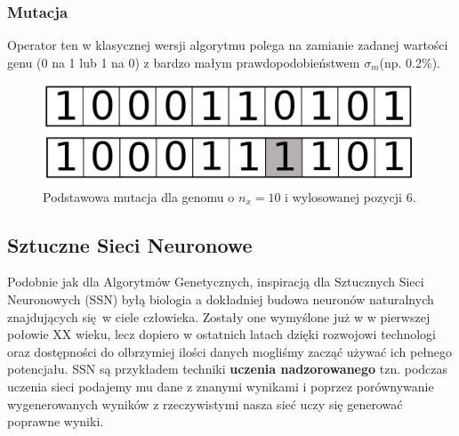 \documentclass{article}
\begin{document}
\subsubsection{Mutacja}
Operator ten w klasycznej wersji algorytmu polega na zamianie zadanej wartości genu
(0 na 1 lub 1 na 0) z bardzo małym  prawdopodobieństwem $\sigma_m$(np. 0.2\%).
\begin{figure}[H]
\centering
\includegraphics[scale=0.2]{mutation_v2.png}
\caption{Podstawowa mutacja dla genomu o $n_x = 10$ i wylosowanej pozycji 6.}
\end{figure}



\subsection{Sztuczne Sieci Neuronowe}
Podobnie jak dla Algorytmów Genetycznych, inspiracją dla Sztucznych Sieci Neuronowych (SSN) 
byłą biologia a dokładniej budowa neuronów naturalnych znajdujących się w ciele człowieka.
Zostały one wymyślone już w w pierwszej połowie XX wieku, lecz dopiero w ostatnich latach
dzięki rozwojowi technologi oraz dostępności do olbrzymiej ilości danych mogliśmy zacząć używać
ich pełnego potencjału. SSN są przykładem techniki \textbf{uczenia nadzorowanego} tzn.
podczas uczenia sieci podajemy mu dane z znanymi wynikami i poprzez porównywanie wygenerowanych
wyników z rzeczywistymi nasza sieć uczy się generować poprawne wyniki.
\end{document}
